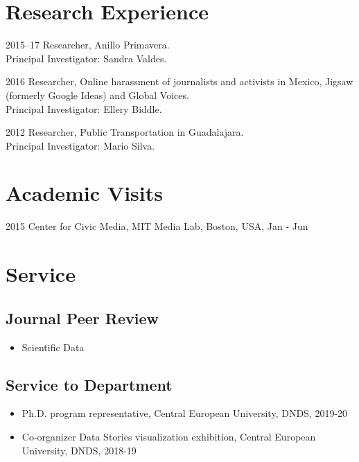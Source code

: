 \documentclass{academiccv}
\begin{document}
\section*{Research Experience}

\begin{tablist}

\item[2015--17] 	\tab Researcher, Anillo Primavera. \\
								Principal Investigator: Sandra Valdes.

\item[2016] 	\tab Researcher, Online harassment of journalists and activists in Mexico, Jigsaw (formerly Google Ideas) and Global Voices. \\
							Principal Investigator: Ellery Biddle.

\item[2012] \tab Researcher, Public Transportation in Guadalajara. \\
						Principal Investigator: Mario Silva.

\end{tablist}


\section*{Academic Visits}

\begin{tablist}

	\item[2015] 	\tab Center for Civic Media, MIT Media Lab, Boston, USA, Jan - Jun

\end{tablist}


\section*{Service}
\subsection*{Journal Peer Review}
\begin{itemize}
  \item Scientific Data
\end{itemize}

\subsection*{Service to Department}
\begin{itemize}
  \item Ph.D. program representative, Central European University, DNDS, 2019-20
	\item Co-organizer Data Stories visualization exhibition, Central European University, DNDS, 2018-19
\end{itemize}
\end{document}

